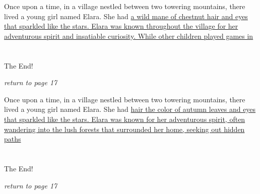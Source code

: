 \documentclass{memoir}
\begin{document}
        


        \hspace{1cm}\vfill
        \begin{minipage}{3in}
        \LARGE
        Once upon a time, in a village nestled between two towering mountains, there lived a young girl named Elara. She had \ul{a wild mane of chestnut hair and eyes that sparkled like the stars. Elara was known throughout the village for her adventurous spirit and insatiable curiosity. While other children played games in}\\ \vspace{5mm} \\
 \\\vspace{1cm} The End! \\ 

        \hspace{1cm}\begin{minipage}{6cm}
        \normalsize
            \hfill \textit{return to page 17}
        \end{minipage} 
        \end{minipage}
        \hspace{1cm}\vfill
        \cleardoublepage

        


        \hspace{1cm}\vfill
        \begin{minipage}{3in}
        \LARGE
        Once upon a time, in a village nestled between two towering mountains, there lived a young girl named Elara. She had \ul{hair the color of autumn leaves and eyes that sparkled like the stars. Elara was known for her adventurous spirit, often wandering into the lush forests that surrounded her home, seeking out hidden paths}\\ \vspace{5mm} \\
 \\\vspace{1cm} The End! \\ 

        \hspace{1cm}\begin{minipage}{6cm}
        \normalsize
            \hfill \textit{return to page 17}
        \end{minipage} 
        \end{minipage}
        \hspace{1cm}\vfill
        \cleardoublepage
\end{document}
